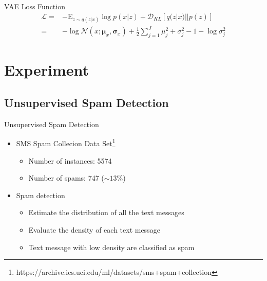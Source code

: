 \documentclass{beamer}
\newcommand{\kldiv}{\mathcal{D}_{KL}}
\newcommand{\E}{\mathrm{E}}
\begin{document}
\begin{frame}[fragile]{VAE Loss Function}
\begin{equation}
\begin{split}
		\mathcal{L} 
		=& -\E_{z\sim q(z|x)}\log p(x|z) + \kldiv[q(z|x)||p(z)]\\
		=& -\log \mathcal{N}(x;\bm{\mu}_x, \bm{\sigma}_x) + \frac{1}{2}\sum_{j=1}^J \mu_j^2 + \sigma_j^2 - 1 - \log \sigma_j^2
\end{split}
\end{equation}
\end{frame}

\section{Experiment}

\subsection{Unsupervised Spam Detection}

\begin{frame}{Unsupervised Spam Detection}
\begin{itemize}
	\item SMS Spam Collecion Data Set\footnote{https://archive.ics.uci.edu/ml/datasets/sms+spam+collection}\begin{itemize}
		\item Number of instances: 5574
		\item Number of spams: 747 ($\sim 13 \%$)
	\end{itemize} 
	\item Spam detection
	\begin{itemize}
		\item Estimate the distribution of all the text messages
		\item Evaluate the density of each text message
		\item Text message with low density are classified as spam
	\end{itemize}
\end{itemize}
\end{frame}
\end{document}
